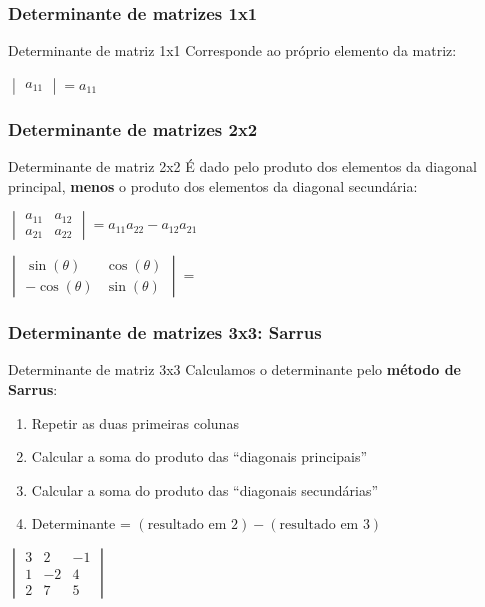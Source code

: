 \documentclass[pdftex, brazil, aspectratio=169]{beamer}
\begin{document}
\begin{frame}[t]
  \frametitle{Determinante de matrizes 1x1}
  \begin{block}{Determinante de matriz 1x1}
    Corresponde ao próprio elemento da matriz:
    \begin{center}
    $\begin{vmatrix}
      a_{11}\end{vmatrix} = a_{11}$
    \end{center}
  \end{block}
\end{frame}

\begin{frame}[t]
  \frametitle{Determinante de matrizes 2x2}
  \begin{block}{Determinante de matriz 2x2}
    É dado pelo produto dos elementos da diagonal principal, \textbf{menos} o
    produto dos elementos da diagonal secundária:
    \begin{center}
    $\begin{vmatrix}
      a_{11} & a_{12}\\
      a_{21} & a_{22}\end{vmatrix} = a_{11}a_{22} - a_{12}a_{21}$
    \end{center}
  \end{block}
  $\begin{vmatrix}
    \sin{(\theta)} & \cos{(\theta)}\\
    -\cos{(\theta)} & \sin{(\theta)}\end{vmatrix} =$
\end{frame}

\begin{frame}[t]
  \frametitle{Determinante de matrizes 3x3: Sarrus}
  \begin{block}{Determinante de matriz 3x3}
    Calculamos o determinante pelo \textbf{método de Sarrus}:
    \begin{enumerate}
      \item Repetir as duas primeiras colunas
      \item Calcular a soma do produto das ``diagonais principais''
      \item Calcular a soma do produto das ``diagonais secundárias''
      \item Determinante = $(\text{resultado em } 2) - (\text{resultado em } 3)$
    \end{enumerate}
  \end{block}
  $\begin{vmatrix}
    3 & 2 & -1\\
    1 & -2 & 4\\
    2 & 7 & 5\end{vmatrix}$
\end{frame}
\end{document}
